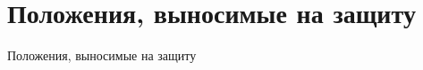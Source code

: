 
\begin{frame}
    \setcounter{framenumber}{1}
    \maketitle
\end{frame}

\section{Положения, выносимые на защиту}

\begin{frame}{Положения, выносимые на защиту}
	
\end{frame}